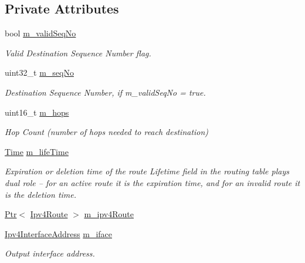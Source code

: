\subsection*{Private Attributes}
\begin{DoxyCompactItemize}
\item 
bool \hyperlink{classns3_1_1aodv_1_1RoutingTableEntry_a2541115c98ccaba8d4b0de6c19cf6c16}{m\+\_\+valid\+Seq\+No}
\begin{DoxyCompactList}\small\item\em Valid Destination Sequence Number flag. \end{DoxyCompactList}\item 
uint32\+\_\+t \hyperlink{classns3_1_1aodv_1_1RoutingTableEntry_add3bc8ee00507187eeddbb42cfa096f8}{m\+\_\+seq\+No}
\begin{DoxyCompactList}\small\item\em Destination Sequence Number, if m\+\_\+valid\+Seq\+No = true. \end{DoxyCompactList}\item 
uint16\+\_\+t \hyperlink{classns3_1_1aodv_1_1RoutingTableEntry_a6dae8561857f2b7215708a317b50b089}{m\+\_\+hops}
\begin{DoxyCompactList}\small\item\em Hop Count (number of hops needed to reach destination) \end{DoxyCompactList}\item 
\hyperlink{classns3_1_1Time}{Time} \hyperlink{classns3_1_1aodv_1_1RoutingTableEntry_add4e939cc8f711981b981007273139d5}{m\+\_\+life\+Time}
\begin{DoxyCompactList}\small\item\em Expiration or deletion time of the route Lifetime field in the routing table plays dual role -- for an active route it is the expiration time, and for an invalid route it is the deletion time. \end{DoxyCompactList}\item 
\hyperlink{classns3_1_1Ptr}{Ptr}$<$ \hyperlink{classns3_1_1Ipv4Route}{Ipv4\+Route} $>$ \hyperlink{classns3_1_1aodv_1_1RoutingTableEntry_a7027a4ad689f53a7c88edfc39edb68cb}{m\+\_\+ipv4\+Route}
\item 
\hyperlink{classns3_1_1Ipv4InterfaceAddress}{Ipv4\+Interface\+Address} \hyperlink{classns3_1_1aodv_1_1RoutingTableEntry_a150a354a9c36dbdc1e65f8b0f3b1fd05}{m\+\_\+iface}
\begin{DoxyCompactList}\small\item\em Output interface address. \end{DoxyCompactList}\item 

\end{DoxyCompactItemize}
